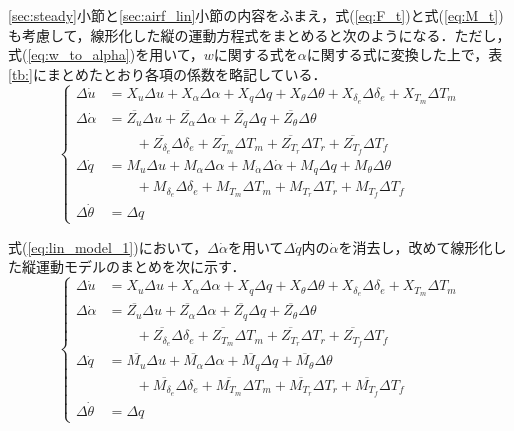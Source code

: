 \ref{sec:steady}小節と\ref{sec:airf_lin}小節の内容をふまえ，式(\ref{eq:F_t})と式(\ref{eq:M_t})も考慮して，線形化した縦の運動方程式をまとめると次のようになる．ただし，式(\ref{eq:w_to_alpha})を用いて，$w$に関する式を$\alpha$に関する式に変換した上で，表\ref{tb:}にまとめたとおり各項の係数を略記している．
\begin{equation}
  \left\{
  \begin{align}
    \Delta \dot{u} &= X_u \Delta u + X_\alpha \Delta \alpha + X_q \Delta q + X_\theta \Delta \theta + X_{\delta_e} \Delta \delta_e + X_{T_m}\Delta T_m \\[3pt]
    \Delta \dot{\alpha} &= \overline{Z_u} \Delta u + \overline{Z_\alpha} \Delta \alpha + \overline{Z_q} \Delta q + \overline{Z_\theta} \Delta \theta \\
    &\qquad+ \overline{Z_{\delta_e}} \Delta \delta_e + \overline{Z_{T_m}}\Delta T_m + \overline{Z_{T_r}}\Delta T_r + \overline{Z_{T_f}}\Delta T_f \\[3pt]
    \Delta \dot{q} &= M_u \Delta u + M_\alpha \Delta \alpha + M_{\dot{\alpha}} \Delta \dot{\alpha} + M_q \Delta q + M_\theta \Delta \theta \\
    &\qquad+ M_{\delta_e} \Delta \delta_e + M_{T_m}\Delta T_m + M_{T_r} \Delta T_r + M_{T_f}\Delta T_f \\[3pt]
    \Delta \dot{\theta} &= \Delta q
  \end{align}
  \label{eq:lin_model_1}
\end{equation}

式(\ref{eq:lin_model_1})において，$\Delta \dot{\alpha}$を用いて$\Delta \dot{q}$内の$\dot{\alpha}$を消去し，改めて線形化した縦運動モデルのまとめを次に示す．
\begin{equation}
  \left\{
  \begin{align}
    \Delta \dot{u} &= X_u \Delta u + X_\alpha \Delta \alpha + X_q \Delta q + X_\theta \Delta \theta + X_{\delta_e} \Delta \delta_e + X_{T_m}\Delta T_m \\[3pt]
    \Delta \dot{\alpha} &= \overline{Z_u} \Delta u + \overline{Z_\alpha} \Delta \alpha + \overline{Z_q} \Delta q + \overline{Z_\theta} \Delta \theta \\
    &\qquad+ \overline{Z_{\delta_e}} \Delta \delta_e + \overline{Z_{T_m}}\Delta T_m + \overline{Z_{T_r}}\Delta T_r + \overline{Z_{T_f}}\Delta T_f \\[3pt]
    \Delta \dot{q} &= \overline{M_u} \Delta u + \overline{M_\alpha} \Delta \alpha + \overline{M_q} \Delta q + \overline{M_\theta} \Delta \theta \\
    &\qquad+ \overline{M_{\delta_e}} \Delta \delta_e + \overline{M_{T_m}}\Delta T_m + \overline{M_{T_r}} \Delta T_r + \overline{M_{T_f}}\Delta T_f \\[3pt]
    \Delta \dot{\theta} &= \Delta q
  \end{align}
  \label{eq:lin_model}
\end{equation}
